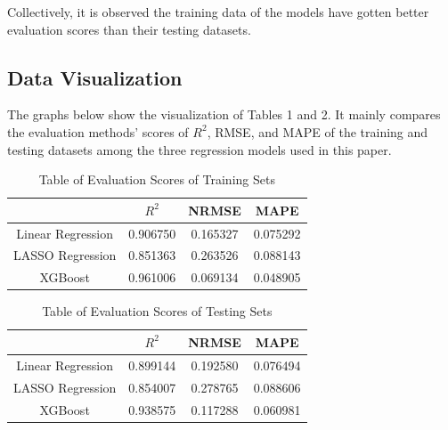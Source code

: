 \documentclass[runningheads]{llncs}
\begin{document}
Collectively, it is observed the training data of the models have gotten better evaluation scores than their testing datasets. 

\subsection{Data Visualization}
The graphs below show the visualization of Tables 1 and 2. It mainly compares the evaluation methods’ scores of $R^2$, RMSE, and MAPE of the training and testing datasets among the three regression models used in this paper.

\begin{table}[h!]
	\caption{Table of Evaluation Scores of Training Sets}
	\centering
	\begin{tabular}{||c c c c||} 
		\hline
		 & $R^2$ & NRMSE & MAPE \\ [0.5ex] 
		\hline\hline
		Linear Regression & 0.906750 & 0.165327 & 0.075292\\ 
		LASSO Regression & 0.851363 & 0.263526 & 0.088143\\
		XGBoost & 0.961006 & 0.069134 & 0.048905\\[1ex] 
		\hline
	\end{tabular}
\end{table}

\begin{table}[h!]
	\caption{Table of Evaluation Scores of Testing Sets}
	\centering
	\begin{tabular}{||c c c c||} 
		\hline
		& $R^2$ & NRMSE & MAPE \\ [0.5ex] 
		\hline\hline
		Linear Regression & 0.899144 & 0.192580 & 0.076494\\ 
		LASSO Regression & 0.854007	& 0.278765 & 0.088606 \\
		XGBoost & 0.938575 & 0.117288 & 0.060981\\[1ex] 
		\hline
	\end{tabular}
\end{table}
\end{document}
